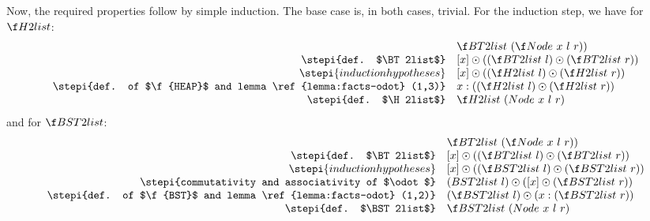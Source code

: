 \documentclass[a4paper,11pt]{llncs}
\begin{document}
Now, the required properties follow by simple induction. The base case is, in
both cases, trivial. For the induction step, we have for $\H2list$:
\[
  \begin{array}{rl}
    & \BT2list\ (\Node\ x\ l\ r)) \\
    \stepi{def. $\BT2list$}
    & [x]\odot((\BT2list\ l)\odot(\BT2list\ r)) \\
    \stepi{induction hypotheses}
    & [x]\odot((\H2list\ l)\odot(\H2list\ r)) \\
    \stepi{def. of $\f{HEAP}$ and lemma \ref{lemma:facts-odot} (1,3)}
    & x:((\H2list\ l)\odot(\H2list\ r)) \\
    \stepi{def. $\H2list$}
    & \H2list\ (Node\ x\ l\ r)
 \end{array}
\]
\noindent and for $\BST2list$:
\[
  \begin{array}{rl}
    & \BT2list\ (\Node\ x\ l\ r)) \\
    \stepi{def. $\BT2list$}
    & [x]\odot((\BT2list\ l)\odot(\BT2list\ r)) \\
    \stepi{induction hypotheses}
    & [x]\odot((\BST2list\ l)\odot(\BST2list\ r)) \\
    \stepi{commutativity and associativity of $\odot$}
    & (BST2list\ l)\odot([x]\odot(\BST2list\ r)) \\
    \stepi{def. of $\f{BST}$ and lemma \ref{lemma:facts-odot} (1,2)}
    & (\BST2list\ l)\odot(x:(\BST2list\ r)) \\
    \stepi{def. $\BST2list$}
    & \BST2list\ (Node\ x\ l\ r)
 \end{array}
\]
\end{document}
